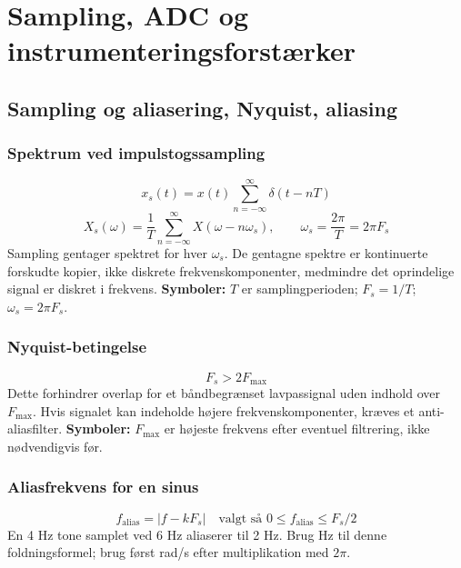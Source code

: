 \section{Sampling, ADC og instrumenteringsforstærker}

\subsection{Sampling og aliasering, Nyquist, aliasing}

\subsubsection{Spektrum ved impulstogssampling}
\[
x_s(t)=x(t)\sum_{n=-\infty}^{\infty}\delta(t-nT)
\]
\[
X_s(\omega)=\frac{1}{T}\sum_{n=-\infty}^{\infty}X(\omega-n\omega_s),\qquad
\omega_s=\frac{2\pi}{T}=2\pi F_s
\]
Sampling gentager spektret for hver \(\omega_s\). De gentagne spektre er kontinuerte forskudte kopier, ikke diskrete frekvenskomponenter, medmindre det oprindelige signal er diskret i frekvens.
\textbf{Symboler:} \(T\) er samplingperioden; \(F_s=1/T\); \(\omega_s=2\pi F_s\).

\subsubsection{Nyquist-betingelse}
\[
F_s>2F_{\max}
\]
Dette forhindrer overlap for et båndbegrænset lavpassignal uden indhold over \(F_{\max}\). Hvis signalet kan indeholde højere frekvenskomponenter, kræves et anti-aliasfilter.
\textbf{Symboler:} \(F_{\max}\) er højeste frekvens efter eventuel filtrering, ikke nødvendigvis før.

\subsubsection{Aliasfrekvens for en sinus}
\[
f_{\mathrm{alias}}=\left|f-kF_s\right|\quad\text{valgt så }0\leq f_{\mathrm{alias}}\leq F_s/2
\]
En 4 Hz tone samplet ved 6 Hz aliaserer til 2 Hz. Brug Hz til denne foldningsformel; brug først rad/s efter multiplikation med \(2\pi\).

